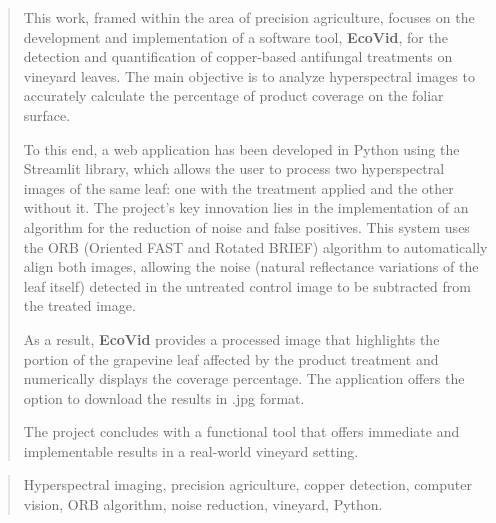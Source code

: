 \documentclass[a4paper,12pt,twoside]{memoir}
\begin{document}
\renewcommand*\abstractname{Abstract}
\begin{abstract}
This work, framed within the area of precision agriculture, focuses on the development and implementation of a software tool, \textbf{EcoVid}, for the detection and quantification of copper-based antifungal treatments on vineyard leaves. The main objective is to analyze hyperspectral images to accurately calculate the percentage of product coverage on the foliar surface.

To this end, a web application has been developed in Python using the Streamlit library, which allows the user to process two hyperspectral images of the same leaf: one with the treatment applied and the other without it. The project's key innovation lies in the implementation of an algorithm for the reduction of noise and false positives. This system uses the ORB (Oriented FAST and Rotated BRIEF) algorithm to automatically align both images, allowing the noise (natural reflectance variations of the leaf itself) detected in the untreated control image to be subtracted from the treated image.

As a result, \textbf{EcoVid} provides a processed image that highlights the portion of the grapevine leaf affected by the product treatment and numerically displays the coverage percentage. The application offers the option to download the results in .jpg format.

The project concludes with a functional tool that offers immediate and implementable results in a real-world vineyard setting.








\end{abstract}

\renewcommand*\abstractname{Keywords}
\begin{abstract}
Hyperspectral imaging, precision agriculture, copper detection, computer vision, ORB algorithm, noise reduction, vineyard, Python.
\end{abstract}

\clearpage

\tableofcontents

\clearpage

\listoffigures

\clearpage

\listoftables
\clearpage

\mainmatter











\end{document}
